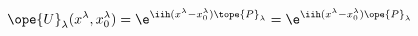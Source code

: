 \begin{equation}	\label{12.109}
\ope{U}_\lambda(x^\lambda,x_0^\lambda)
=
\e^{\iih(x^\lambda-x_0^\lambda)\tope{P}_{\lambda}}
=
\e^{\iih(x^\lambda-x_0^\lambda)\ope{P}_{\lambda}}
	\end{equation}

